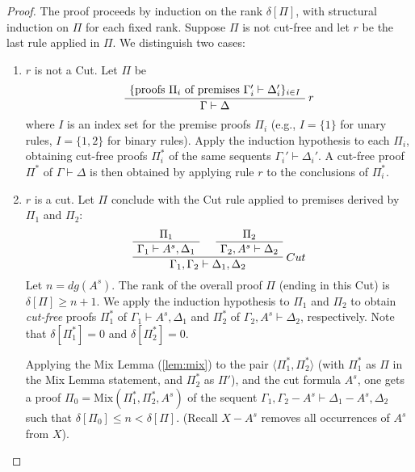 \documentclass{article}
\newcommand{\seq}[2]{{#1} \vdash{} {#2}}
\newcommand{\pf}[2]{{#1}^{#2}} %
\newcommand{\cana}[1]{#1\!-\!\pf{A}{s}}
\theoremstyle{definition}
\begin{document}
\begin{proof}

The proof proceeds by induction on the rank $\delta[\Pi]$, with structural induction on $\Pi$ for each fixed rank.
Suppose $\Pi$ is not cut-free and let $r$ be the last rule applied in $\Pi$. We distinguish two cases:
\begin{enumerate}
    \item $r$ is not a Cut.
        Let $\Pi$ be
        \[
        \AxiomC{$\{\text{proofs } \Pi_i \text{ of premises } \seq{\Gamma_i'}{\Delta_i'}\}_{i \in I}$}
        \RightLabel{$r$}
        \UnaryInfC{$\seq{\Gamma}{\Delta}$} %
        \DisplayProof %
        \]
        where $I$ is an index set for the premise proofs $\Pi_i$ (e.g., $I=\{1\}$ for unary rules, $I=\{1,2\}$ for binary rules).
        Apply the induction hypothesis to each $\Pi_i$, obtaining cut-free proofs $\Pi_i^*$ of the same sequents $\seq{\Gamma_i'}{\Delta_i'}$.
        A cut-free proof $\Pi^*$ of $\seq{\Gamma}{\Delta}$ is then obtained by applying rule $r$ to the conclusions of $\Pi_i^*$.

    \item $r$ is a cut.
        Let $\Pi$ conclude with the Cut rule applied to premises derived by $\Pi_1$ and $\Pi_2$:
        \[
        \AxiomC{$\Pi_1$}
        \UnaryInfC{$\seq{\Gamma_1}{\pf{A}{s}, \Delta_1}$}
        \AxiomC{$\Pi_2$}
        \UnaryInfC{$\seq{\Gamma_2, \pf{A}{s}}{\Delta_2}$}
        \RightLabel{$Cut$}
        \BinaryInfC{$\seq{\Gamma_1, \Gamma_2}{\Delta_1, \Delta_2}$} %
        \DisplayProof
        \]
        Let $n = dg(\pf{A}{s})$. The rank of the overall proof $\Pi$ (ending in this Cut) is $\delta[\Pi] \ge n+1$.
        We apply the induction hypothesis to $\Pi_1$ and $\Pi_2$ to obtain
        \emph{cut-free} proofs $\Pi_1^*$ of $\seq{\Gamma_1}{\pf{A}{s}, \Delta_1}$ and $\Pi_2^*$ of $\seq{\Gamma_2, \pf{A}{s}}{\Delta_2}$, respectively.
        Note that $\delta[\Pi_1^*] = 0$ and $\delta[\Pi_2^*] = 0$.

        Applying the Mix Lemma (\ref{lem:mix}) to the pair $\langle \Pi_1^*, \Pi_2^* \rangle$ (with $\Pi_1^*$ as $\Pi$ in the Mix Lemma statement, and $\Pi_2^*$ as $\Pi'$),
        and the cut formula $\pf{A}{s}$, one gets a proof $\Pi_0 = \text{Mix}(\Pi_1^*, \Pi_2^*, \pf{A}{s})$
        of the sequent $\seq{\Gamma_1, \cana{\Gamma_2}}{\cana{\Delta_1}, \Delta_2}$ such that
        $\delta[\Pi_0] \le n < \delta[\Pi]$. (Recall $\cana{X}$ removes all occurrences of $\pf{A}{s}$ from $X$).


\end{enumerate}
\end{proof}
\end{document}
